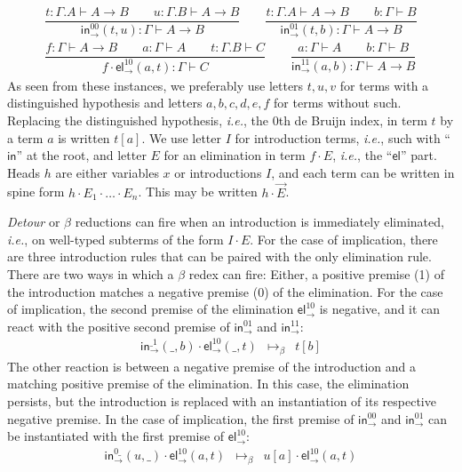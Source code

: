 \documentclass[a4paper,USenglish,cleveref, autoref, thm-restate]{lipics-v2021}
\newcommand{\ie}{\emph{i.e.}\xspace}
\newcommand{\ru}{\dfrac}
\newcommand{\tin}{\ensuremath{\mathsf{in}}}
\newcommand{\inn}[2]{\ensuremath{\tin_{#1}^{#2}}}
\newcommand{\tel}{\mathsf{el}}
\newcommand{\el}[2]{\ensuremath{\tel_{#1}^{#2}}}
\newcommand{\contract}[1][]{\mapsto_{#1}}
\begin{document}
%
\begin{gather*}
  \ru{t : \Gamma.A \vdash A \to B \qquad
      u : \Gamma.B \vdash A \to B
    }{\inn\to{00}(t,u) : \Gamma \vdash A \to B
    }
\qquad
  \ru{t : \Gamma.A \vdash A \to B \qquad
      b : \Gamma \vdash B
    }{\inn\to{01}(t,b) : \Gamma \vdash A \to B
    }
\\[2ex]
  \ru{f : \Gamma \vdash A \to B \qquad
      a : \Gamma \vdash A \qquad
      t : \Gamma.B \vdash C
    }{f \cdot \el\to{10}(a,t) : \Gamma \vdash C
    }
\qquad
  \ru{a : \Gamma \vdash A \qquad
      b : \Gamma \vdash B
    }{\inn\to{11}(a,b) : \Gamma \vdash A \to B
    }
\end{gather*}
As seen from these instances,
we preferably use letters $t,u,v$ for terms with a distinguished
hypothesis
and letters $a,b,c,d,e,f$ for terms without such.
Replacing the distinguished hypothesis, \ie,
the 0th de Bruijn index,
in term $t$ by a term $a$
is written $t[a]$.  We use letter $I$ for introduction terms, \ie,
such with ``$\tin$'' at the root,
and letter $E$ for an elimination in term $f \cdot E$,
\ie, the ``$\tel$'' part.  Heads $h$ are either variables $x$ or
introductions $I$, and each term can be written in spine form $h \cdot
E_1 \cdot \dots \cdot E_n$.  This may be written $h \cdot \vec E$.

\emph{Detour} or $\beta$ reductions can fire when an introduction is
immediately eliminated, \ie, on well-typed subterms of the form $I
\cdot E$.  For the case of implication, there are three
introduction rules that can be paired with the only elimination rule.
There are two ways in which a $\beta$ redex can fire:  Either, a
positive premise (1) of the introduction matches a negative premise
(0) of the elimination.  For the case of implication, the second
premise of the elimination $\el\to{10}$
is negative, and it can react with the
positive second premise of $\inn\to{01}$ and $\inn\to{11}$:
\[
\begin{array}{lll}
  \inn\to{\_1}(\_,b) \cdot \el\to{10}(\_,t)
    & \contract[\beta] &
  t[b]
\end{array}
\]
The other reaction is between a negative premise of the introduction
and a matching positive premise of the elimination.  In this case, the
elimination persists, but the introduction is replaced with an
instantiation of its respective negative premise.  In the case of
implication, the first premise of $\inn\to{00}$ and $\inn\to{01}$ can
be instantiated with the first premise of $\el\to{10}$:
\[
\begin{array}{lll}
  \inn\to{0\_}(u,\_) \cdot \el\to{10}(a,t)
    & \contract[\beta] &
  u[a] \cdot \el\to{10}(a,t)
\\
\end{array}
\]
\end{document}
